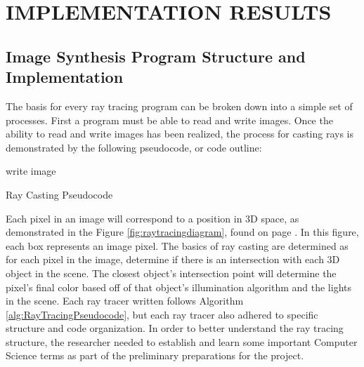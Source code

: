 %
%
%


\chapter{\uppercase {Implementation Results}}

\section{Image Synthesis Program Structure and Implementation}

The basis for every ray tracing program can be broken down into a simple set of processes.  First a program must be able to read and write images.  Once the ability to read and write images has been realized, the process for casting rays is demonstrated by the following pseudocode, or code outline:

\begin{algorithm}[H]
\label{alg:RayTracingPseudocode}
write image\;
\caption{Ray Casting Pseudocode}
\end{algorithm}

Each pixel in an image will correspond to a position in 3D space, as demonstrated in the Figure \ref{fig:raytracingdiagram}, found on page \pageref{fig:raytracingdiagram}. In this figure, each box represents an image pixel.  The basics of ray casting are determined as for each pixel in the image, determine if there is an intersection with each 3D object in the scene.  The closest object's intersection point will determine the pixel's final color based off of that object's illumination algorithm and the lights in the scene.  Each ray tracer written follows Algorithm \ref{alg:RayTracingPseudocode}, but each ray tracer also adhered to specific structure and code organization.  In order to better understand the ray tracing structure, the researcher needed to establish and learn some important Computer Science terms as part of the preliminary preparations for the project.


